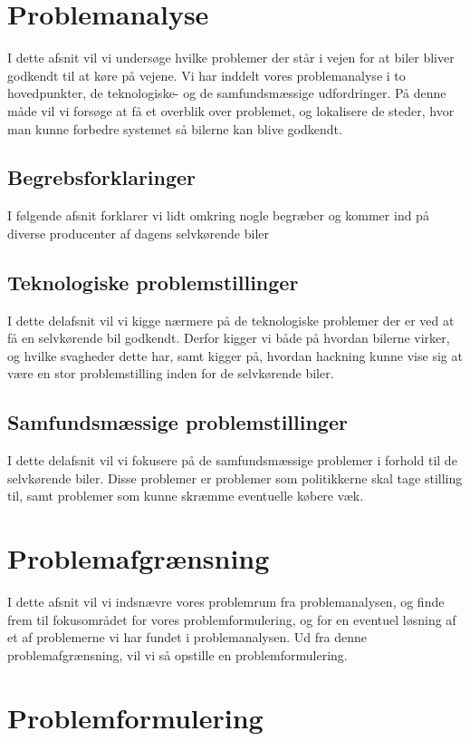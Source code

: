 \documentclass[12pt,hidelinks]{article}
\begin{document}
	\section{Problemanalyse}
	{I dette afsnit vil vi undersøge hvilke problemer der står i vejen for at biler bliver godkendt til at køre på vejene. Vi har inddelt vores problemanalyse i to hovedpunkter, de teknologiske- og de samfundsmæssige udfordringer. På denne måde vil vi forsøge at få et overblik over problemet, og lokalisere de steder, hvor man kunne forbedre systemet så bilerne kan blive godkendt.}
	\subsection{Begrebsforklaringer}
	{I følgende afsnit forklarer vi lidt omkring nogle begræber og kommer ind på diverse producenter af dagens selvkørende biler}
	
	\subsection{Teknologiske problemstillinger}
	I dette delafsnit vil vi kigge nærmere på de teknologiske problemer der er ved at få en selvkørende bil godkendt. Derfor kigger vi både på hvordan bilerne virker, og hvilke svagheder dette har, samt kigger på, hvordan hackning kunne vise sig at være en stor problemstilling inden for de selvkørende biler.
	
	
	
	\subsection{Samfundsmæssige problemstillinger}
	I dette delafsnit vil vi fokusere på de samfundsmæssige problemer i forhold til de selvkørende biler. Disse problemer er problemer som politikkerne skal tage stilling til, samt problemer som kunne skræmme eventuelle købere væk.
	
	
    
	\section{Problemafgrænsning}
	{I dette afsnit vil vi indsnævre vores problemrum fra problemanalysen, og finde frem til fokusområdet for vores problemformulering, og for en eventuel løsning af et af problemerne vi har fundet i problemanalysen. Ud fra denne problemafgrænsning, vil vi så opstille en problemformulering.}
    
	
    \section{Problemformulering}
    
	
	
\end{document}
